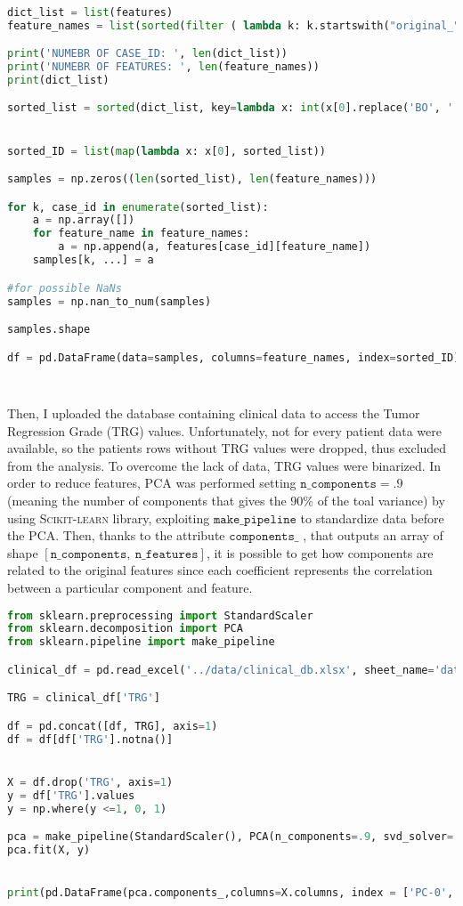 \documentclass{standalone}
\begin{document}
\begin{lstlisting}[language = python, caption=Features dataframe implementation]

dict_list = list(features)
feature_names = list(sorted(filter ( lambda k: k.startswith("original_"), features[dict_list[0]] )))

print('NUMEBR OF CASE_ID: ', len(dict_list))
print('NUMEBR OF FEATURES: ', len(feature_names))
print(dict_list)

sorted_list = sorted(dict_list, key=lambda x: int(x[0].replace('BO', '')))


sorted_ID = list(map(lambda x: x[0], sorted_list))

samples = np.zeros((len(sorted_list), len(feature_names)))

for k, case_id in enumerate(sorted_list):
    a = np.array([])
    for feature_name in feature_names:
        a = np.append(a, features[case_id][feature_name])
    samples[k, ...] = a

#for possible NaNs
samples = np.nan_to_num(samples)

samples.shape

df = pd.DataFrame(data=samples, columns=feature_names, index=sorted_ID)

        
\end{lstlisting}

Then, I uploaded the database containing clinical data to access the Tumor Regression Grade (TRG) values.
Unfortunately, not for every patient data were available, so the patients rows without TRG values were dropped, thus excluded from the analysis.
To overcome the lack of data, TRG values were binarized.
In order to reduce features, PCA was performed setting $\mathtt{n\_components = .9}$ (meaning the number of components that gives the $90 \%$ of the toal variance) by using \textsc{Scikit-learn} library\cite{scikit}, exploiting $\mathtt{make\_pipeline}$ to standardize data before the PCA.
Then, thanks to the attribute $\mathtt{components\_}$ , that outputs an array of shape $[ \mathtt{n \_ components} , \:  \mathtt{n \_ features} ]$, it is possible to get how components are related to the original features since each coefficient represents the correlation between a particular component and feature.

\begin{lstlisting}[language = python, caption=PCA implementation]
from sklearn.preprocessing import StandardScaler
from sklearn.decomposition import PCA
from sklearn.pipeline import make_pipeline

clinical_df = pd.read_excel('../data/clinical_db.xlsx', sheet_name='data', index_col='PatientID')

TRG = clinical_df['TRG']

df = pd.concat([df, TRG], axis=1)
df = df[df['TRG'].notna()]


X = df.drop('TRG', axis=1)
y = df['TRG'].values
y = np.where(y <=1, 0, 1)

pca = make_pipeline(StandardScaler(), PCA(n_components=.9, svd_solver='full'))
pca.fit(X, y)


print(pd.DataFrame(pca.components_,columns=X.columns, index = ['PC-0','PC-1', 'PC-2', 'PC-3', 'PC-4', 'PC-5']))
\end{lstlisting}
\end{document}
